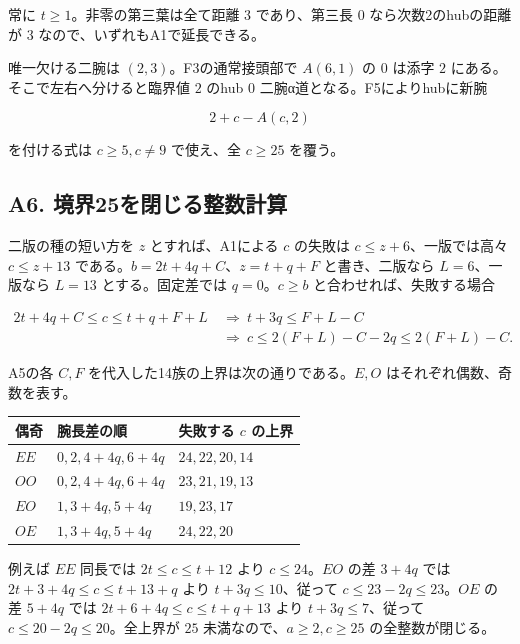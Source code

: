 \documentclass[
  10pt,
  a4paper,
]{article}
\begin{document}
常に \(t\ge1\)。非零の第三葉は全て距離 \(3\) であり、第三長 \(0\)
なら次数2のhubの距離が \(3\) なので、いずれもA1で延長できる。

唯一欠ける二腕は \((2,3)\)。F3の通常接頭部で \(A(6,1)\) の \(0\) は添字
\(2\) にある。そこで左右へ分けると臨界値 \(2\) のhub \(0\)
二腕α道となる。F5によりhubに新腕

\[
2+c-A(c,2)
\]

を付ける式は \(c\ge5,c\ne9\) で使え、全 \(c\ge25\) を覆う。

\subsection{A6.
境界25を閉じる整数計算}\label{a6.-ux5883ux754c25ux3092ux9589ux3058ux308bux6574ux6570ux8a08ux7b97}

二版の種の短い方を \(z\) とすれば、A1による \(c\) の失敗は
\(c\le z+6\)、一版では高々 \(c\le z+13\)
である。\(b=2t+4q+C\)、\(z=t+q+F\) と書き、二版なら \(L=6\)、一版なら
\(L=13\) とする。固定差では \(q=0\)。\(c\ge b\)
と合わせれば、失敗する場合

\[
\begin{aligned}
2t+4q+C\le c\le t+q+F+L
&\ \Longrightarrow\ t+3q\le F+L-C\\
&\ \Longrightarrow\ c\le2(F+L)-C-2q\le2(F+L)-C.
\end{aligned}
\]

A5の各 \(C,F\) を代入した14族の上界は次の通りである。\(E,O\)
はそれぞれ偶数、奇数を表す。

\begin{longtable}[]{@{}lll@{}}
\toprule\noalign{}
偶奇 & 腕長差の順 & 失敗する \(c\) の上界 \\
\midrule\noalign{}
\endhead
\bottomrule\noalign{}
\endlastfoot
\(EE\) & \(0,2,4+4q,6+4q\) & \(24,22,20,14\) \\
\(OO\) & \(0,2,4+4q,6+4q\) & \(23,21,19,13\) \\
\(EO\) & \(1,3+4q,5+4q\) & \(19,23,17\) \\
\(OE\) & \(1,3+4q,5+4q\) & \(24,22,20\) \\
\end{longtable}

例えば \(EE\) 同長では \(2t\le c\le t+12\) より \(c\le24\)。\(EO\) の差
\(3+4q\) では \(2t+3+4q\le c\le t+13+q\) より \(t+3q\le10\)、従って
\(c\le23-2q\le23\)。\(OE\) の差 \(5+4q\) では \(2t+6+4q\le c\le t+q+13\)
より \(t+3q\le7\)、従って \(c\le20-2q\le20\)。全上界が \(25\)
未満なので、\(a\ge2,c\ge25\) の全整数が閉じる。
\end{document}
